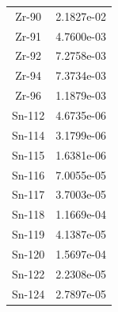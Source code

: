 \begin{table}[h!]
\begin{tabular}{c c}
  Zr-90 & 2.1827e-02 \\
  Zr-91 & 4.7600e-03 \\
  Zr-92 & 7.2758e-03 \\
  Zr-94 & 7.3734e-03 \\
  Zr-96 & 1.1879e-03 \\
  Sn-112 & 4.6735e-06 \\
  Sn-114 & 3.1799e-06 \\
  Sn-115 & 1.6381e-06 \\
  Sn-116 & 7.0055e-05 \\
  Sn-117 & 3.7003e-05 \\
  Sn-118 & 1.1669e-04 \\
  Sn-119 & 4.1387e-05 \\
  Sn-120 & 1.5697e-04 \\
  Sn-122 & 2.2308e-05 \\
  Sn-124 & 2.7897e-05 \\
  \bottomrule
\end{tabular}
\end{table}

